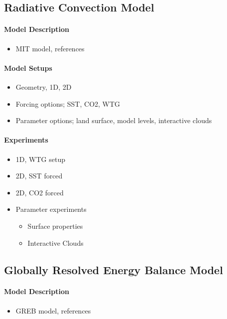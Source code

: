 
\subsection{Radiative Convection Model}

\paragraph{Model Description}
\begin{itemize}
	\item MIT model, references
\end{itemize}

\paragraph{Model Setups}
\begin{itemize}
	\item Geometry, 1D, 2D
	\item Forcing options; SST, CO2, WTG
	\item Parameter options; land surface, model levels, interactive clouds
\end{itemize}

\paragraph{Experiments}
\begin{itemize}
	\item 1D, WTG setup
	\item 2D, SST forced
	\item 2D, CO2 forced
	\item Parameter experiments
\begin{itemize}
	\item Surface properties
	\item Interactive Clouds
\end{itemize}
\end{itemize}


\subsection{Globally Resolved Energy Balance Model}

\paragraph{Model Description}
\begin{itemize}
	\item GREB model, references
\end{itemize}


